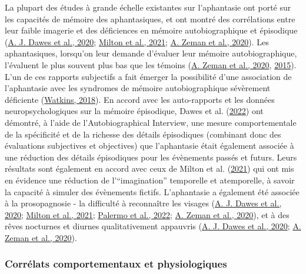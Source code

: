 \documentclass[
  12pt,
]{article}
\begin{document}
La plupart des études à grande échelle existantes sur l'aphantasie ont
porté sur les capacités de mémoire des aphantasiques, et ont montré des
corrélations entre leur faible imagerie et des déficiences en mémoire
autobiographique et épisodique
(\protect\hyperlink{ref-dawesCognitiveProfileMultisensory2020}{A. J.
Dawes et al., 2020};
\protect\hyperlink{ref-miltonBehavioralNeuralSignatures2021}{Milton et
al., 2021};
\protect\hyperlink{ref-zemanPhantasiaPsychologicalSignificance2020}{A.
Zeman et al., 2020}). Les aphantasiques, lorsqu'on leur demande
d'évaluer leur mémoire autobiographique, l'évaluent le plus souvent plus
bas que les témoins
(\protect\hyperlink{ref-zemanPhantasiaPsychologicalSignificance2020}{A.
Zeman et al., 2020},
\protect\hyperlink{ref-zemanLivesImageryCongenital2015}{2015}). L'un de
ces rapports subjectifs a fait émerger la possibilité d'une association
de l'aphantasie avec les syndromes de mémoire autobiographique
sévèrement déficiente
(\protect\hyperlink{ref-watkinsPhantasiaSeverelyDeficient2018}{Watkins,
2018}). En accord avec les auto-rapports et les données
neuropsychologiques sur la mémoire épisodique, Dawes et al.
(\protect\hyperlink{ref-dawesInnerVisionsMind2022}{2022}) ont démontré,
à l'aide de l'Autobiographical Interview, une mesure comportementale de
la spécificité et de la richesse des détails épisodiques (combinant donc
des évaluations subjectives et objectives) que l'aphantasie était
également associée à une réduction des détails épisodiques pour les
évènements passés et futurs. Leurs résultats sont également en accord
avec ceux de Milton et al.
(\protect\hyperlink{ref-miltonBehavioralNeuralSignatures2021}{2021}) qui
ont mis en évidence une réduction de l'``imagination'' temporelle et
atemporelle, à savoir la capacité à simuler des évènements fictifs.
L'aphantasie a également été associée à la prosopagnosie - la difficulté
à reconnaître les visages
(\protect\hyperlink{ref-dawesCognitiveProfileMultisensory2020}{A. J.
Dawes et al., 2020};
\protect\hyperlink{ref-miltonBehavioralNeuralSignatures2021}{Milton et
al., 2021};
\protect\hyperlink{ref-palermoCongenitalLackExtraordinary2022}{Palermo
et al., 2022};
\protect\hyperlink{ref-zemanPhantasiaPsychologicalSignificance2020}{A.
Zeman et al., 2020}), et à des rêves nocturnes et diurnes
qualitativement appauvris
(\protect\hyperlink{ref-dawesCognitiveProfileMultisensory2020}{A. J.
Dawes et al., 2020};
\protect\hyperlink{ref-zemanPhantasiaPsychologicalSignificance2020}{A.
Zeman et al., 2020}).

\hypertarget{corruxe9lats-comportementaux-et-physiologiques}{%
\subsubsection{Corrélats comportementaux et
physiologiques}\label{corruxe9lats-comportementaux-et-physiologiques}}
\end{document}
